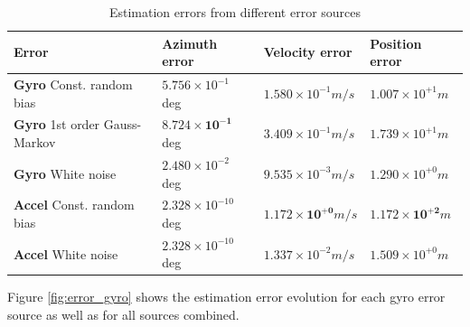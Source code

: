 \documentclass{article}
\newcommand{\e}[1]{\times 10^{#1}} %
\begin{document}
\begin{table}[h]
\centering
\begin{tabular}{llll}
Error  & Azimuth error & Velocity error & Position error \\
\hline
\textbf{Gyro} Const. random bias & $5.756\e{-1}$ deg & $1.580\e{-1} \si{m/s}$ & $1.007\e{+1} \si{m}$ \\
\textbf{Gyro} 1st order Gauss-Markov & $\mathbf{8.724\e{-1}}$ deg & $3.409\e{-1} \si{m/s}$ & $1.739\e{+1} \si{m}$ \\
\textbf{Gyro} White noise & $2.480\e{-2}$ deg & $9.535\e{-3} \si{m/s}$ & $1.290\e{+0} \si{m}$ \\
\hline
\textbf{Accel} Const. random bias & $2.328\e{-10}$ deg & $\mathbf{1.172\e{+0}} \si{m/s}$ & $\mathbf{1.172\e{+2}} \si{m}$ \\
\textbf{Accel} White noise & $2.328\e{-10}$ deg & $1.337\e{-2} \si{m/s}$ & $1.509\e{+0} \si{m}$ 
\end{tabular}
\caption{Estimation errors from different error sources}
\label{tab:err_result}
\end{table}


Figure \ref{fig:error_gyro} shows the estimation error evolution for each gyro error source as well as for all sources combined.
\end{document}
